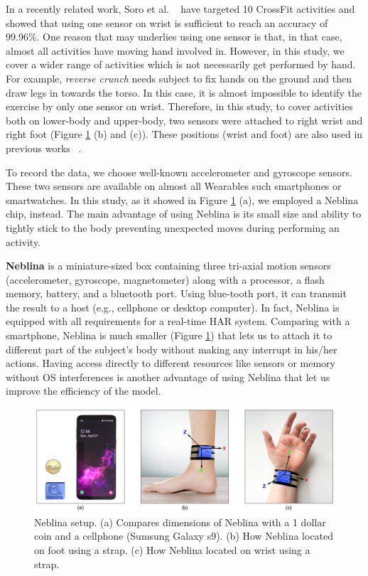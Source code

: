\documentclass[journal,article,submit,moreauthors,pdftex]{Definitions/mdpi}
\begin{document}
In a recently related work, Soro et al. ~\cite{soro2019recognition} have targeted 10 CrossFit activities and showed that using one sensor on wrist is sufficient to reach an accuracy of 99.96\%. One reason that may underlies using one sensor is that, in that case, almost all activities have moving hand involved in. However, in this study, we cover a wider range of activities which is not necessarily get performed by hand. For example, \textit{reverse crunch} needs subject to fix hands on the ground and then draw legs in towards the torso. In this case, it is almost impossible to identify the exercise by only one sensor on wrist. Therefore, in this study, to cover activities both on lower-body and upper-body, two sensors were attached to right wrist and right foot (Figure \ref{neblina_setup} (b) and (c)). These positions (wrist and foot) are also used in previous works ~\cite{baldominos2019comparison, anwary2018automatic, soro2019recognition}.

To record the data, we choose well-known accelerometer and gyroscope sensors. These two sensors are  available on almost all Wearables such smartphones or smartwatches. In this study, as it showed in Figure \ref{neblina_setup} (a), we employed a Neblina chip, instead. The main advantage of using Neblina is its small size and ability to tightly stick to the body preventing unexpected moves during performing an activity.

\noindent \textbf{Neblina} is a miniature-sized box containing three tri-axial motion sensors (accelerometer, gyroscope, magnetometer) along with a processor, a flash memory, battery, and a bluetooth port. Using blue-tooth port, it can transmit the result to a host (e.g., cellphone or desktop computer).  In fact, Neblina is equipped with all requirements for a real-time HAR system. Comparing with a smartphone, Neblina is much smaller (Figure \ref{neblina_setup}) that lets us to attach it to different part of the subject's body without making any interrupt in his/her actions\cite{de2018comparative}. Having access directly to different resources like sensors or memory without OS interferences is another advantage of using Neblina that let us improve the efficiency of the model.
\begin{figure}[H]
	\centering
	\includegraphics[width=10 cm]{Definitions/images/neblina_setup.jpg}
	\caption{Neblina setup. (a) Compares dimensions of Neblina with a 1 dollar coin and a cellphone (Sumsung Galaxy s9). (b) How Neblina located on foot using a strap. (c) How Neblina located on wrist using a strap.}
	\label{neblina_setup}
\end{figure} 
\end{document}
